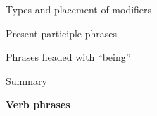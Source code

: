 \begin{listWWNumviileveli}
\begin{listWWNumviilevelii}
\setcounter{listWWNumviileveliii}{0}
\begin{listWWNumviileveliii}
\item 
\begin{styleListParagraph}
Types and placement of modifiers
\end{styleListParagraph}

\item 
\begin{styleListParagraph}
Present participle phrases 
\end{styleListParagraph}

\item 
\begin{styleListParagraph}
Phrases headed with “being” 
\end{styleListParagraph}

\end{listWWNumviileveliii}
\item 
\begin{styleListParagraph}
Summary 
\end{styleListParagraph}

\end{listWWNumviilevelii}
\end{listWWNumviileveli}
\setcounter{listWWNumiileveli}{0}
\begin{listWWNumiileveli}
\item 
\begin{styleListParagraph}
\textbf{Verb phrases }
\end{styleListParagraph}

\end{listWWNumiileveli}
\setcounter{listWWNumviiileveli}{5}
